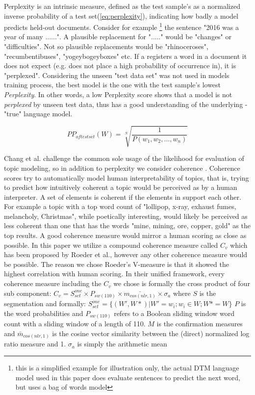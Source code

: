 \documentclass[12pt,journal,letterpaper,oneside,onecolumn]{IEEEtran}
\begin{document}
Perplexity is an intrinsic measure, defined as the test sample's as a normalized inverse probability of a test set(\ref{eq:perplexity}), indicating how badly a model predicts held-out documents.
Consider for example \footnote{this is a simplified example for illustration only, the actual DTM language model used in this paper does evaluate sentences to predict the next word, but uses a bag of words model} the sentence "2016 was a year of many ......".
A plausible replacement for "....." would be "changes" or "difficulties". Not so plausible replacements would be "rhinoceroses", "recumbentibuses", "yogeybogeyboxes" etc. If a registers a word in a document it does not expect (e.g. does not place a high probability of occurrence in), it is "perplexed".
Considering the unseen "test data set" was not used in models training process, the best model is the one with the test sample's lowest \textit{Perplexity}. In other words, a low Perplexity score shows that a model is not \textit{perplexed} by unseen test data, thus has a good understanding of the underlying - "true" language model.

\begin{equation}
    \label{eq:perplexity}
    PP_{of test set}(W) = \sqrt[N]{\frac{1}{P(w_1, w_2, ... , w_n)}}
\end{equation}

 Chang et al.\cite{ref_lda_human_evaluation} challenge the common sole usage of the likelihood for evaluation of topic modeling, so in addition to perplexity we consider coherence\cite{ref_lda_coh_exploring} \cite{ref_lda_coh_1} \cite{ref_lda_coh_2} \cite{ref_lda_coh_3}.
Coherence scores try to automatically model human interpretability of topics, that is, trying to predict how intuitively coherent a topic would be perceived as by a human interpreter. 
A set of elements is coherent if the elements in support each other.
For example a topic with a top word count of "lollipop, x-ray, exhaust fumes, melancholy, Christmas", while poetically interesting, would likely be perceived as less coherent than one that has the words "mine, mining, ore, copper, gold" as the top results.
A good coherence measure would mirror a human scoring as close as possible.
In this paper we utilize a compound coherence measure called $C_v$ which has been proposed by Roeder et al.\cite{ref_lda_coh_exploring}, however any other coherence measure would be possible.
The reason we chose Roeder's V-measure is that it showed the highest correlation with human scoring.
In their unified framework, every coherence measure including the  $C_v$ we chose is formally the cross product of four sub component: $C_v  = S^{one}_{set} \times P_{sw(110)} \times \bar{m_{cos(nlr,1)}} \times \sigma_a$ where $S$ is the segmentation and formally:
$S^{one}_{set} = \Big\{ (W', W*) | W' = {w_i}; w_i \in W; W* = W \Big\}$
$P$ is the word probabilities and  $P_{sw(110)}$ refers to a Boolean sliding window word count with a sliding window of a length of 110. 
$M$ is the confirmation measures and $\bar{m}_{cos(nlr,1)}$ is the cosine vector similarity between the (direct) normalized log ratio measure and 1.
$\sigma_a$ is simply the arithmetic mean
\end{document}
